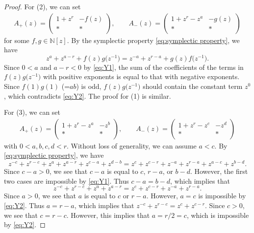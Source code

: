 \documentclass[10pt,a4paper]{amsart}
\numberwithin{equation}{section}
\theoremstyle{definition}
\begin{document}
\begin{proof}
 For (2), we can set
 \begin{align*}
 A_+(z) =
 \begin{pmatrix}
 1 + z^r & -f(z) \\
 * & *
 \end{pmatrix},\qquad
 A_-(z) =
 \begin{pmatrix}
 1 + z^r - z^a & -g(z) \\
 * & *
 \end{pmatrix}
 \end{align*}
 for some $f, g \in \mathbb{N}[z]$.
 By the symplectic property \eqref{eq:symplectic property}, we have
 \[
 z^a + z^{a - r} + f(z) g\bigl(z^{-1}\bigr) =
 z^{-a} + z^{r-a} + g(z) f\bigl(z^{-1}\bigr).
 \]
 Since $0 < a$ and $a-r<0$ by \eqref{eq:Y1},
 the sum of the coefficients of the terms in $f(z)g\bigl(z^{-1}\bigr)$ with positive exponents
 is equal to that with negative exponents.
 Since $f(1) g(1)$ (=$ab$) is odd, $f(z) g\bigl(z^{-1}\bigr)$ should contain the constant term $z^0$,
 which contradicts \eqref{eq:Y2}.
 The proof for (1) is similar.

 For (3), we can set
 \begin{align*}
 A_+(z) =
 \begin{pmatrix}
 1 + z^r - z^a & -z^b \\
 * & *
 \end{pmatrix},\qquad
 A_-(z) =
 \begin{pmatrix}
 1 + z^r - z^c & -z^d \\
 * & *
 \end{pmatrix}
 \end{align*}
 with $0< a,b,c,d < r$.
 Without loss of generality, we can assume $a<c$.
 By \eqref{eq:symplectic property}, we have
 \begin{equation*}
 z^{-c} + z^{r-c} + z^a + z^{a-r} + z^{c-a} + z^{d-b}
 = z^{c} + z^{c-r} + z^{-a} + z^{r-a} + z^{a-c} + z^{b-d}.
 \end{equation*}
 Since $c - a > 0$, we see that $c - a$ is equal to $c$, $r-a$, or $b-d$.
 However, the first two cases are impossible by \eqref{eq:Y1}.
 Thus $c - a = b - d$, which implies that
 \begin{equation*}
 z^{-c} + z^{r-c} + z^a + z^{a-r}
 = z^{c} + z^{c-r} + z^{-a} + z^{r-a}.
 \end{equation*}
 Since $a > 0$, we see that $a$ is equal to $c$ or $r-a$.
 However, $a = c$ is impossible by \eqref{eq:Y2}.
 Thus $a = r-a$, which implies that
$
 z^{-c} + z^{r-c}
 = z^{c} + z^{c-r}$.
 Since $c > 0$, we see that $c = r -c$.
 However, this implies that $a = r/2 = c$, which is impossible by \eqref{eq:Y2}.


\end{proof}
\end{document}
